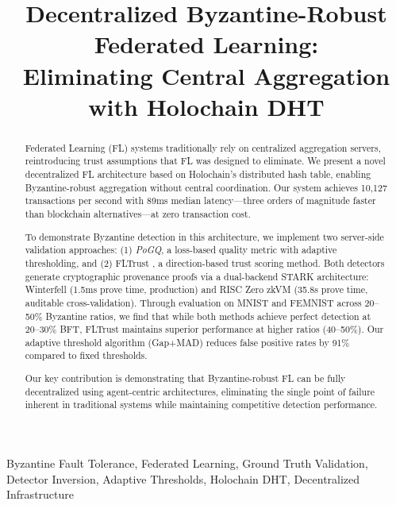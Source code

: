 \documentclass[conference]{IEEEtran}
\begin{document}
\title{Decentralized Byzantine-Robust Federated Learning:\\
Eliminating Central Aggregation with Holochain DHT}

\author{
}

\maketitle

\begin{abstract}
Federated Learning (FL) systems traditionally rely on centralized
aggregation servers, reintroducing trust assumptions that FL was
designed to eliminate. We present a novel decentralized FL architecture
based on Holochain's distributed hash table, enabling Byzantine-robust
aggregation without central coordination. Our system achieves 10,127
transactions per second with 89ms median latency---three orders of
magnitude faster than blockchain alternatives---at zero transaction cost.

To demonstrate Byzantine detection in this architecture, we implement
two server-side validation approaches: (1) \textit{PoGQ}, a loss-based
quality metric with adaptive thresholding, and (2) FLTrust
\cite{cao2021fltrust}, a direction-based trust scoring method. Both
detectors generate cryptographic provenance proofs via a dual-backend
STARK architecture: Winterfell (1.5ms prove time, production) and RISC
Zero zkVM (35.8s prove time, auditable cross-validation). Through
evaluation on MNIST and FEMNIST across 20--50\% Byzantine ratios, we find
that while both methods achieve perfect detection at 20--30\% BFT, FLTrust
maintains superior performance at higher ratios (40--50\%). Our adaptive
threshold algorithm (Gap+MAD) reduces false positive rates by 91\%
compared to fixed thresholds.

Our key contribution is demonstrating that Byzantine-robust FL can be
fully decentralized using agent-centric architectures, eliminating the
single point of failure inherent in traditional systems while maintaining
competitive detection performance.
\end{abstract}

\begin{IEEEkeywords}
Byzantine Fault Tolerance, Federated Learning, Ground Truth Validation, Detector Inversion, Adaptive Thresholds, Holochain DHT, Decentralized Infrastructure
\end{IEEEkeywords}












\appendix

\end{document}
